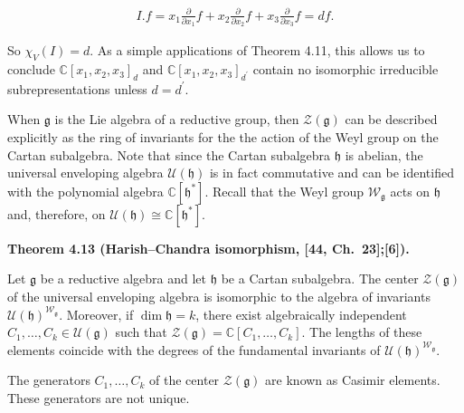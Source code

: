 \documentclass[10pt,a4paper]{article}
\begin{document}
\[\begin{aligned}
\displaystyle I.f=x_{1}\frac{\partial}{\partial x_{1}}f+x_{2}\frac{\partial}{\partial x_{2}}f+x_{3}\frac{\partial}{\partial x_{3}}f=df.
\end{aligned}\]


So $\chi_{V}(I)=d$.
As a simple applications of Theorem 4.11, this allows us to conclude $\mathbb{C}[x_{1},x_{2},x_{3}]_{d}$ and $\mathbb{C}[x_{1},x_{2},x_{3}]_{d^{\prime}}$ contain no isomorphic irreducible subrepresentations unless $d=d^{\prime}$.






When $\mathfrak{g}$ is the Lie algebra of a reductive group, then $\mathcal{Z}(\mathfrak{g})$ can be described explicitly as the ring of invariants for the the action of the Weyl group on the Cartan subalgebra.
Note that since the Cartan subalgebra $\mathfrak{h}$ is abelian, the universal enveloping algebra $\mathcal{U}(\mathfrak{h})$ is in fact commutative and can be identified with the polynomial algebra $\mathbb{C}[\mathfrak{h}^{*}]$.
Recall that the Weyl group $\mathcal{W}_{\mathfrak{g}}$ acts on $\mathfrak{h}$ and, therefore, on $\mathcal{U}(\mathfrak{h})\cong\mathbb{C}[\mathfrak{h}^{*}]$.





\par\medskip\noindent\textbf{Theorem 4.13 (Harish–Chandra isomorphism, [44, Ch. 23];[6]).}\par



Let $\mathfrak{g}$ be a reductive algebra and let $\mathfrak{h}$ be a Cartan subalgebra.
The center $\mathcal{Z}(\mathfrak{g})$ of the universal enveloping algebra is isomorphic to the algebra of invariants $\mathcal{U}(\mathfrak{h})^{\mathcal{W}_{\mathfrak{g}}}$. Moreover, if $\dim\mathfrak{h}=k$, there exist algebraically independent $C_{1},\dots,C_{k}\in\mathcal{U}(\mathfrak{g})$ such that $\mathcal{Z}(\mathfrak{g})=\mathbb{C}[C_{1},\dots,C_{k}]$. The lengths of these elements coincide with the degrees of the fundamental invariants of $\mathcal{U}(\mathfrak{h})^{\mathcal{W}_{\mathfrak{g}}}$.






The generators $C_{1},\dots,C_{k}$ of the center $\mathcal{Z}(\mathfrak{g})$ are known as Casimir elements.
These generators are not unique.
\end{document}
